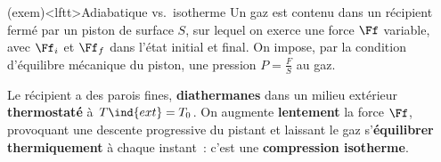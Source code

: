 \documentclass[../../main/main.tex]{subfiles}
\begin{document}
\begin{tcb}[breakable](exem)<lftt>{Adiabatique vs.\ isotherme}
	Un gaz est contenu dans un récipient fermé par un piston de surface $S$, sur
	lequel on exerce une force $\Ff$ variable, avec $\Ff_i$ et $\Ff_f$ dans l'état
	initial et final. On impose, par la condition d'équilibre mécanique du piston,
	une pression $P = \frac{F}{S}$ au gaz.
	\begin{isd}
		Le récipient a des parois fines, \textbf{diathermanes} dans un milieu
		extérieur \textbf{thermostaté} à $T\ind{ext} = T_0$. On augmente
		\textbf{lentement} la force $\Ff$, provoquant une descente progressive du
		pistant et laissant le gaz s'\textbf{équilibrer thermiquement} à chaque
		instant~: c'est une \textbf{compression isotherme}.
		\tcblower
		\begin{center}
		\end{center}
	\end{isd}

\end{tcb}
\end{document}
